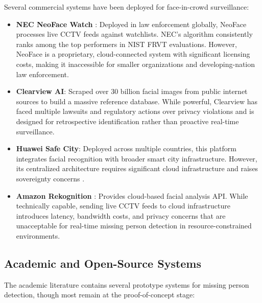 \documentclass[12pt, a4paper]{article}
\begin{document}
Several commercial systems have been deployed for face-in-crowd surveillance:

\begin{itemize}[leftmargin=*]
    \item \textbf{NEC NeoFace Watch} \cite{nec2023}: Deployed in law enforcement globally, NeoFace processes live CCTV feeds against watchlists. NEC's algorithm consistently ranks among the top performers in NIST FRVT evaluations. However, NeoFace is a proprietary, cloud-connected system with significant licensing costs, making it inaccessible for smaller organizations and developing-nation law enforcement.
    
    \item \textbf{Clearview AI}: Scraped over 30 billion facial images from public internet sources to build a massive reference database. While powerful, Clearview has faced multiple lawsuits and regulatory actions over privacy violations \cite{hill2020} and is designed for retrospective identification rather than proactive real-time surveillance.
    
    \item \textbf{Huawei Safe City}: Deployed across multiple countries, this platform integrates facial recognition with broader smart city infrastructure. However, its centralized architecture requires significant cloud infrastructure and raises sovereignty concerns \cite{feldstein2019}.
    
    \item \textbf{Amazon Rekognition} \cite{aws2023}: Provides cloud-based facial analysis API. While technically capable, sending live CCTV feeds to cloud infrastructure introduces latency, bandwidth costs, and privacy concerns that are unacceptable for real-time missing person detection in resource-constrained environments.
\end{itemize}

\subsection{Academic and Open-Source Systems}

The academic literature contains several prototype systems for missing person detection, though most remain at the proof-of-concept stage:
\end{document}
